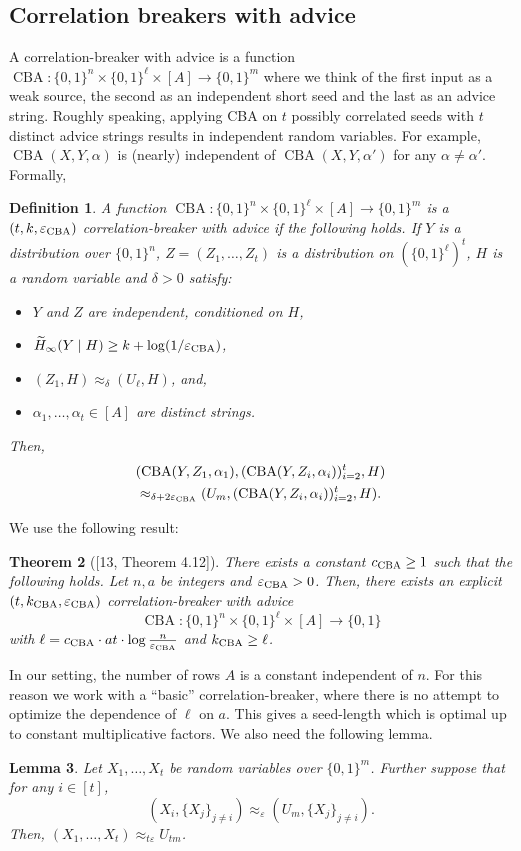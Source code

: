 \documentclass[10pt,a4paper]{article}
\newtheorem{theorem}{Theorem}
\newtheorem{definition}[theorem]{Definition}
\newtheorem{lemma}[theorem]{Lemma}
\DeclareMathOperator{\CBA}{CBA}
\newcommand{\HH}{\widetilde H_\infty}
\begin{document}
\subsection*{Correlation breakers with advice}
A correlation-breaker with advice is a function $\CBA:\{0,1\}^n\times\{0,1\}^\ell\times[A]\to\{0,1\}^m$ where we think of the first input as a weak source, the second as an independent short seed and the last as an advice string. Roughly speaking, applying CBA on $t$ possibly correlated seeds with $t$ distinct advice strings results in independent random variables. For example, $\CBA(X,Y,\alpha)$ is (nearly) independent of $\CBA(X,Y,\alpha')$ for any $\alpha\ne\alpha'$. Formally,
\begin{definition}
A function $\CBA:\{0,1\}^n\times\{0,1\}^\ell\times[A]\to\{0,1\}^m$ is a $(t,k,\varepsilon_{\rm CBA})$ correlation-breaker with advice if the following holds. If $Y$ is a distribution over $\{0,1\}^n$, $Z=(Z_1,\ldots,Z_t)$ is a distribution on $(\{0,1\}^\ell)^t$, $H$ is a random variable and $\delta>0$ satisfy:
\begin{itemize}
\item $Y$ and $Z$ are independent, conditioned on $H$,
\item $\HH(Y\mid H)\ge k+\log(1/\varepsilon_{\rm CBA})$,
\item $(Z_1,H)\approx_\delta(U_\ell,H)$, and,
\item $\alpha_1,\ldots,\alpha_t\in[A]$ are distinct strings.
\end{itemize}
Then,
\begin{multline*}
(\CBA(Y,Z_1,\alpha_1),(\CBA(Y,Z_i,\alpha_i))_{i=2}^t,H)\\
\approx_{\delta+2\varepsilon_{\rm CBA}}(U_m,(\CBA(Y,Z_i,\alpha_i))_{i=2}^t,H).
\end{multline*}
\end{definition}
We use the following result:
\begin{theorem}[{[13, Theorem 4.12]}]
There exists a constant $c_{\rm CBA}\ge1$ such that the following holds. Let $n,a$ be integers and $\varepsilon_{\rm CBA}>0$. Then, there exists an explicit $(t,k_{\rm CBA},\varepsilon_{\rm CBA})$ correlation-breaker with advice
\[\CBA:\{0,1\}^n\times\{0,1\}^\ell\times[A]\to\{0,1\}\]
with $\ell=c_{\rm CBA}\cdot at\cdot\log\frac n{\varepsilon_{\rm CBA}}$ and $k_{\rm CBA}\ge\ell$.
\end{theorem}
In our setting, the number of rows $A$ is a constant independent of $n$. For this reason we work with a ``basic'' correlation-breaker, where there is no attempt to optimize the dependence of $\ell$ on $a$. This gives a seed-length which is optimal up to constant multiplicative factors.
We also need the following lemma.
\begin{lemma}
Let $X_1,\ldots,X_t$ be random variables over $\{0,1\}^m$. Further suppose that for any $i\in[t]$,
\[(X_i,\{X_j\}_{j\ne i})\approx_\varepsilon(U_m,\{X_j\}_{j\ne i}).\]
Then, $(X_1,\ldots,X_t)\approx_{t\varepsilon}U_{tm}$.
\end{lemma}
\end{document}
